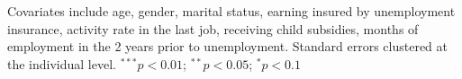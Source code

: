 \begin{table}
\begin{center}
\begin{threeparttable}
\begin{tabular}{l D{.}{.}{5.5} D{.}{.}{5.5} D{.}{.}{5.5} D{.}{.}{5.5}}
\bottomrule
\end{tabular}
\begin{tablenotes}[flushleft]
\scriptsize{Covariates include age, gender, marital status, earning insured by unemployment insurance, activity rate in the last job, receiving child subsidies, months of employment in the 2 years prior to unemployment. Standard errors clustered at the individual level. $^{***}p<0.01$; $^{**}p<0.05$; $^{*}p<0.1$}
\end{tablenotes}
\end{threeparttable}
\label{tab:final_ols_results_combined}
\end{center}
\end{table}
